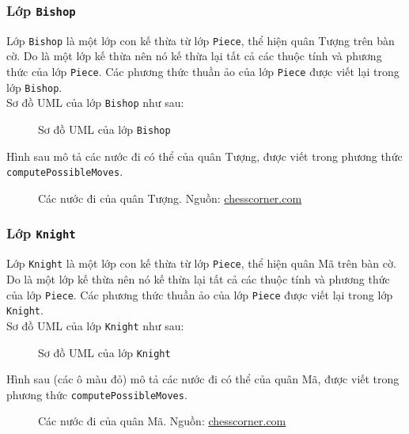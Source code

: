 \subsubsection{Lớp \lstinline{Bishop}}
Lớp \lstinline{Bishop} là một lớp con kế thừa từ lớp \lstinline{Piece}, thể hiện quân Tượng trên bàn cờ. Do là một lớp kế thừa nên nó kế thừa lại tất cả các thuộc tính và phương thức của lớp \lstinline{Piece}. Các phương thức thuần ảo của lớp \lstinline{Piece} được viết lại trong lớp \lstinline{Bishop}.\\
Sơ đồ UML của lớp \lstinline{Bishop} như sau:
\begin{figure}[H]
\caption{Sơ đồ UML của lớp \lstinline{Bishop}}
\end{figure}
Hình sau mô tả các nước đi có thể của quân Tượng, được viết trong phương thức \lstinline{computePossibleMoves}.
\begin{figure}[H]
\caption{Các nước đi của quân Tượng. Nguồn: \url{chesscorner.com}}
\end{figure}
\subsubsection{Lớp \lstinline{Knight}}
Lớp \lstinline{Knight} là một lớp con kế thừa từ lớp \lstinline{Piece}, thể hiện quân Mã trên bàn cờ. Do là một lớp kế thừa nên nó kế thừa lại tất cả các thuộc tính và phương thức của lớp \lstinline{Piece}. Các phương thức thuần ảo của lớp \lstinline{Piece} được viết lại trong lớp \lstinline{Knight}.\\
Sơ đồ UML của lớp \lstinline{Knight} như sau:
\begin{figure}[H]
\caption{Sơ đồ UML của lớp \lstinline{Knight}}
\end{figure}
Hình sau (các ô màu đỏ) mô tả các nước đi có thể của quân Mã, được viết trong phương thức \lstinline{computePossibleMoves}.
\begin{figure}[H]
\caption{Các nước đi của quân Mã. Nguồn: \url{chesscorner.com}}
\end{figure}
